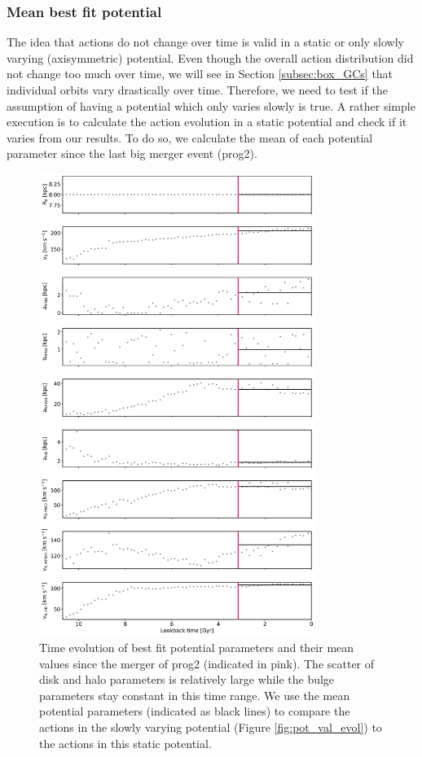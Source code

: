 \subsubsection{Mean best fit potential}\label{subsubsec:GCs_actions_time_mean_right_pot}
The idea that actions do not change over time is valid in a static or only slowly varying (axisymmetric) potential. Even though the overall action distribution did not change too much over time, we will see in Section \ref{subsec:box_GCs} that individual orbits vary drastically over time. Therefore, we need to test if the assumption of having a potential which only varies slowly is true. A rather simple execution is to calculate the action evolution in a static potential and check if it varies from our results. To do so, we calculate the mean of each potential parameter since the last big merger event (prog2). 
\begin{figure}[htbp]
\captionsetup{format=plain}
    \centering
	\includegraphics[width=0.8\textwidth]{plots/Dynamics/mean_pot/potential_evolution_with_mean_jan19.png}
    \caption{Time evolution of best fit potential parameters and their mean values since the merger of prog2 (indicated in pink). The scatter of disk and halo parameters is relatively large while the bulge parameters stay constant in this time range. We use the mean potential parameters (indicated as black lines) to compare the actions in the slowly varying potential (Figure \ref{fig:pot_val_evol}) to the actions in this static potential.}\label{fig:potential_mean_evolution}
\end{figure}
